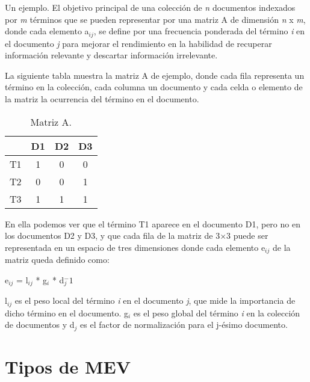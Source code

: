 \documentclass[titlepage]{article}
\begin{document}
	Un ejemplo. El objetivo principal de una colección de \textit{n} documentos indexados por \textit{m} términos que se pueden representar por una matriz A de dimensión \textit{n} x \textit{m}, donde cada elemento a$_{ij}$, se define por una frecuencia ponderada del término \textit{i} en el documento \textit{j} para mejorar el rendimiento en la habilidad de recuperar información relevante y descartar información irrelevante. 
	
	La siguiente tabla muestra la matriz A de ejemplo, donde cada fila representa un término en la colección, cada columna un documento y cada celda o elemento de la matriz la ocurrencia del término en el documento.
	
	\renewcommand{\figurename}{Figura}
	\renewcommand{\tablename}{Tabla} 
	
	\begin{table}[h]
		\begin{center}
			\begin{tabular}{ |c|c|c|c| }
				\hline 
				& D1 & D2 & D3 \\
				\hline
				T1 & 1 & 0 & 0 \\ 
				\hline
				T2 & 0 & 0	& 1 \\ 
				\hline
				T3 & 1 & 1	& 1 \\
				\hline
			\end{tabular}
			\caption{Matriz A.}
			\label{fig: Table 1}
		\end{center}
	\end{table}
	
	En ella podemos ver que el término T1 aparece en el documento D1, pero no en los documentos D2 y D3, y que cada fila de la matriz de 3×3 puede ser representada en un espacio de tres dimensiones donde cada elemento e$_{ij}$ de la matriz queda definido como: 
	
	\begin{center}
		e$_{ij}$ = l$_{ij}$ * g$_{i}$ * d$_{j}^-1$
	\end{center}
	
	l$_{ij}$ es el peso local del término \textit{i} en el documento \textit{j}, que mide la importancia de dicho término en el documento. g$_{i}$ es el peso global del término \textit{i} en la colección de documentos y d$_{j}$ es el factor de normalización para el j-ésimo documento.
	
	\section{Tipos de MEV}
	
\end{document}
